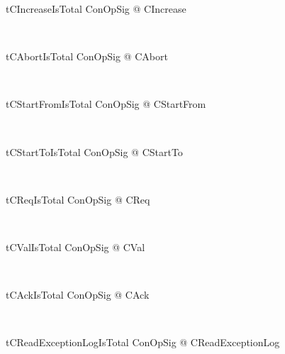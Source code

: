 \begin{LNewThm}
\begin{theorem}{tCIncreaseIsTotal}
    \forall ConOpSig @ \pre CIncrease
\end{theorem}~\end{LNewThm}

\begin{LNewThm}
\begin{theorem}{tCAbortIsTotal}
    \forall ConOpSig @ \pre CAbort
\end{theorem}~\end{LNewThm}

\begin{LNewThm}
\begin{theorem}{tCStartFromIsTotal}
    \forall ConOpSig @ \pre CStartFrom
\end{theorem}~\end{LNewThm}
\begin{LNewThm}
\begin{theorem}{tCStartToIsTotal}
    \forall ConOpSig @ \pre CStartTo
\end{theorem}~\end{LNewThm}

\begin{LNewThm}
\begin{theorem}{tCReqIsTotal}
    \forall ConOpSig @ \pre CReq
\end{theorem}~\end{LNewThm}

\begin{LNewThm}
\begin{theorem}{tCValIsTotal}
    \forall ConOpSig @ \pre CVal
\end{theorem}~\end{LNewThm}
\begin{LNewThm}
\begin{theorem}{tCAckIsTotal}
    \forall ConOpSig @ \pre CAck
\end{theorem}~\end{LNewThm}

\begin{LNewThm}
\begin{theorem}{tCReadExceptionLogIsTotal}
    \forall ConOpSig @ \pre CReadExceptionLog
\end{theorem}~\end{LNewThm}

